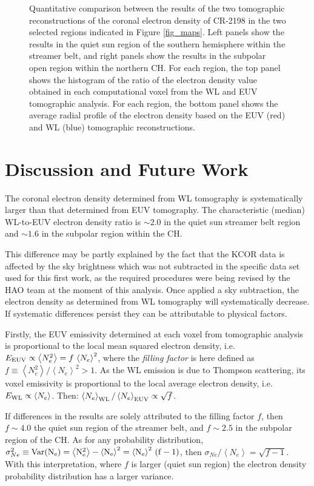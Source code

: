 \documentclass[baaa]{baaa}
\def\Eeuv{E_{\rm{EUV}}}
\def\Ewl{E_{\rm{WL}}}
\def\AvgNE2{\left<N_e^2\right>}
\def\AvgNe{\left<N_e\right>}
\def\SigmaNe{\sigma_{Ne}}
\begin{document}
\begin{figure}[!ht]
  \caption{Quantitative comparison between the results of the two tomographic reconstructions of the coronal electron density of CR-2198 in the two selected regions indicated in Figure \ref{fig_maps}. Left panels show the results in the quiet sun region of the southern hemisphere within the streamer belt, and right panels show the results in the subpolar open region within the northern CH. For each region, the top panel shows the histogram of the ratio of the electron density value obtained in each computational voxel from the WL and EUV tomographic analysis. For each region, the bottom panel shows the average radial profile of the electron density based on the EUV (red) and WL (blue) tomographic reconstructions.}
  \label{fig_analysis}
\end{figure}

\section{Discussion and Future Work}

The coronal electron density determined from WL tomography is systematically larger than that determined from EUV tomography. The characteristic (median) WL-to-EUV electron density ratio is $\sim 2.0$ in the quiet sun streamer belt region and $\sim 1.6$ in the subpolar region within the CH.

This difference may be partly explained by the fact that the KCOR data is affected by the sky brightness which was not subtracted in the specific data set used for this first work, as the required procedures were being revised by the HAO team at the moment of this analysis. Once applied a sky subtraction, the electron density as determined from WL tomography will systematically decrease. If systematic differences persist they can be attributable to physical factors. 

Firstly, the EUV emissivity determined at each voxel from tomographic analysis is proportional to the local mean squared electron density, i.e. $\Eeuv \propto \AvgNE2 = f\,\AvgNe^2$, where the \emph{filling factor} is here defined as $f\equiv\AvgNE2 / \AvgNe^2 > 1$. As the WL emission is due to Thompson scattering, its voxel emissivity is proportional to the local average electron density, i.e. $\Ewl \propto \AvgNe$. Then: $\AvgNe_{\rm{WL}} / \AvgNe_{\rm{EUV}} \propto \sqrt{f}$. 

If differences in the results are solely attributed to the filling factor $f$, then $f\sim 4.0$ the quiet sun region of the streamer belt, and $f\sim 2.5$ in the subpolar region of the CH. As for any probability distribution, $\SigmaNe^2 \equiv \rm{Var}(N_e) = \AvgNE2 - \AvgNe^2 = \AvgNe^2 \, (f-1)$, then $\SigmaNe / \AvgNe = \sqrt{f-1}$. With this interpretation, where $f$ is larger (quiet sun region) the electron density probability distribution has a larger variance.
\end{document}
